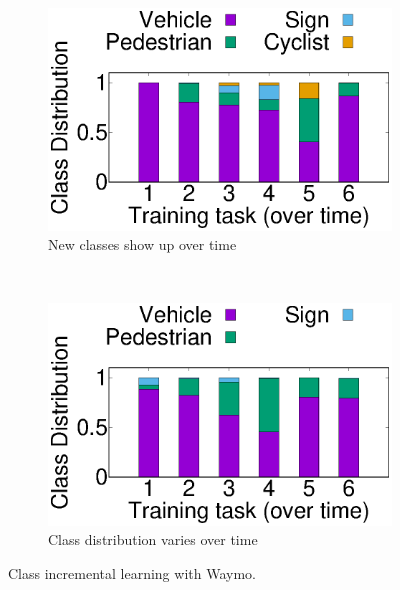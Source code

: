 \begin{figure}[t]
  \begin{subfigure}[t]{0.5\linewidth}
    \centering
    \includegraphics[width=\linewidth]{figures/motivation/Class_Incrementality/new_class.eps}
    \caption{New classes show up over time}
  \end{subfigure}
  ~~
  \begin{subfigure}[t]{0.5\linewidth}
    \centering
    \includegraphics[width=\linewidth]{figures/motivation/Class_Incrementality/class_dist_change.eps} 
    \caption{Class distribution varies over time}
    \label{fig:class-distrib-motivation}
  \end{subfigure}
  
  \caption{Class incremental learning with Waymo.   }
  \label{fig:waymo-motivation}
\end{figure}


